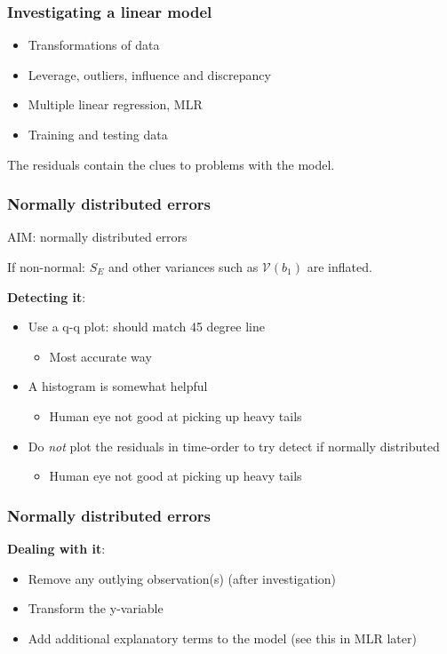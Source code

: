 \begin{frame}\frametitle{Investigating a linear model}
	\begin{itemize}
		\item	Transformations of data 
		\item	Leverage, outliers, influence and discrepancy 
		\item	Multiple linear regression, MLR 
		\item	Training and testing data 
	\end{itemize}
	
	The residuals contain the clues to problems with the model.
\end{frame}

\begin{frame}\frametitle{Normally distributed errors}
	
	AIM: normally distributed errors
	
	If non-normal: $S_E$ and other variances such as $\mathcal{V}(b_1)$ are inflated.
	
	\textbf{Detecting it}: 
	\begin{itemize}
		\item	Use a q-q plot: should match 45 degree line 
		\begin{itemize}
			\item	Most accurate way 
		\end{itemize}
		\item	A histogram is somewhat helpful 
		\begin{itemize}
			\item	Human eye not good at picking up heavy tails 
		\end{itemize}
		\item	Do \emph{not} plot the residuals in time-order to try detect if normally distributed 
		\begin{itemize}
			\item	Human eye not good at picking up heavy tails 
		\end{itemize}
	\end{itemize}
\end{frame}

\begin{frame}\frametitle{Normally distributed errors}
	
	\textbf{Dealing with it}: 
	\begin{itemize}
		\item	Remove any outlying observation(s) (after investigation) 
		\item	Transform the y-variable 
		\item	Add additional explanatory terms to the model (see this in MLR later) 
	\end{itemize}
\end{frame}

